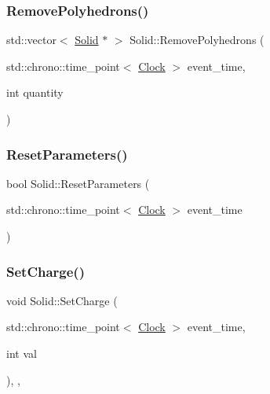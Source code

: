 \mbox{\label{classSolid_a0fc53641571eb796c9d6bc33ae7a7138}} 
\subsubsection{\texorpdfstring{Remove\+Polyhedrons()}{RemovePolyhedrons()}}
{\footnotesize\ttfamily std\+::vector$<$ \mbox{\hyperlink{classSolid}{Solid}} $\ast$ $>$ Solid\+::\+Remove\+Polyhedrons (\begin{DoxyParamCaption}\item[{std\+::chrono\+::time\+\_\+point$<$ \mbox{\hyperlink{universe_8h_a0ef8d951d1ca5ab3cfaf7ab4c7a6fd80}{Clock}} $>$}]{event\+\_\+time,  }\item[{int}]{quantity }\end{DoxyParamCaption})}

\mbox{\label{classSolid_ac43dc78fa7f6a3348fc99751ff6bbc52}} 
\subsubsection{\texorpdfstring{Reset\+Parameters()}{ResetParameters()}}
{\footnotesize\ttfamily bool Solid\+::\+Reset\+Parameters (\begin{DoxyParamCaption}\item[{std\+::chrono\+::time\+\_\+point$<$ \mbox{\hyperlink{universe_8h_a0ef8d951d1ca5ab3cfaf7ab4c7a6fd80}{Clock}} $>$}]{event\+\_\+time }\end{DoxyParamCaption})}

\mbox{\label{classSolid_a37503e6b25f912254414e778af2e75cd}} 
\subsubsection{\texorpdfstring{Set\+Charge()}{SetCharge()}}
{\footnotesize\ttfamily void Solid\+::\+Set\+Charge (\begin{DoxyParamCaption}\item[{std\+::chrono\+::time\+\_\+point$<$ \mbox{\hyperlink{universe_8h_a0ef8d951d1ca5ab3cfaf7ab4c7a6fd80}{Clock}} $>$}]{event\+\_\+time,  }\item[{int}]{val }\end{DoxyParamCaption})\hspace{0.3cm}{\ttfamily [inline]}, {\ttfamily [final]}, {\ttfamily [virtual]}}



